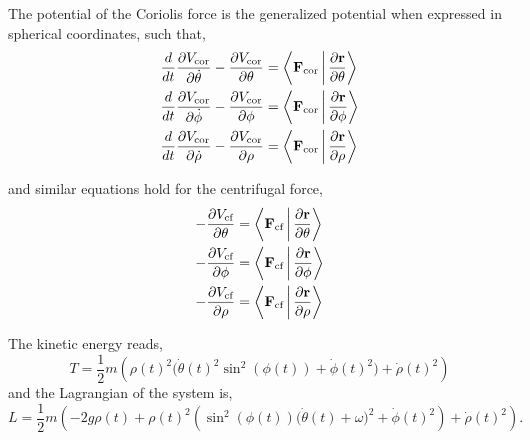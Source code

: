 \documentclass[12pt]{article}
\begin{document}
The potential of the Coriolis force is the generalized potential when expressed in spherical
coordinates, such that,
\begin{align}
  \frac{d}{dt}\frac{\partial V_\text{cor}}{\partial\dot\theta}
    - \frac{\partial V_\text{cor}}{\partial\theta}
    &= \left\langle\vb{F}_\text{cor}\,\middle|\,\frac{\partial\vb{r}}{\partial\theta}\right\rangle \\
  \frac{d}{dt}\frac{\partial V_\text{cor}}{\partial\dot\phi}
    - \frac{\partial V_\text{cor}}{\partial\phi}
    &= \left\langle\vb{F}_\text{cor}\,\middle|\,\frac{\partial\vb{r}}{\partial\phi}\right\rangle \\
  \frac{d}{dt}\frac{\partial V_\text{cor}}{\partial\dot\rho}
    - \frac{\partial V_\text{cor}}{\partial\rho}
    &= \left\langle\vb{F}_\text{cor}\,\middle|\,\frac{\partial\vb{r}}{\partial\rho}\right\rangle
\end{align}

and similar equations hold for the centrifugal force,
\begin{align}
  -\frac{\partial V_\text{cf}}{\partial\theta}
    &= \left\langle\vb{F}_\text{cf}\,\middle|\,\frac{\partial\vb{r}}{\partial\theta}\right\rangle \\
  -\frac{\partial V_\text{cf}}{\partial\phi}
    &= \left\langle\vb{F}_\text{cf}\,\middle|\,\frac{\partial\vb{r}}{\partial\phi}\right\rangle \\
  -\frac{\partial V_\text{cf}}{\partial\rho}
    &= \left\langle\vb{F}_\text{cf}\,\middle|\,\frac{\partial\vb{r}}{\partial\rho}\right\rangle
\end{align}

The kinetic energy reads,
\begin{equation}
  T = \frac{1}{2}m\left(\rho(t)^2\bigl(\dot\theta(t)^2\sin^2(\phi(t)) + \dot\phi(t)^2\bigr)
    + \dot\rho(t)^2\right)
\end{equation}
and the Lagrangian of the system is,
\begin{equation}
  L = \frac{1}{2}m\left(-2g\rho(t) + \rho(t)^2\left(\sin^2(\phi(t))\bigl(\dot\theta(t)+\omega\bigr)^2
    + \dot\phi(t)^2\right) + \dot\rho(t)^2\right).
\end{equation}
\end{document}

